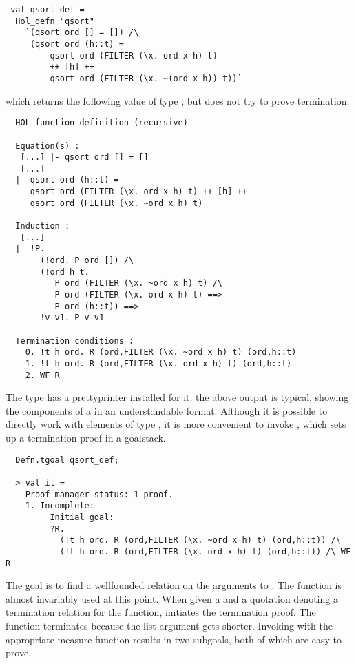 \setcounter{sessioncount}{0}
\begin{session}
\begin{hol}
\begin{verbatim}
 val qsort_def =
  Hol_defn "qsort"
    `(qsort ord [] = []) /\
     (qsort ord (h::t) =
         qsort ord (FILTER (\x. ord x h) t)
         ++ [h] ++
         qsort ord (FILTER (\x. ~(ord x h)) t))`
\end{verbatim}
\end{hol}
\end{session}
which returns the following value of type , but does not try
to prove termination.
\begin{session}
\begin{hol}
\begin{verbatim}
  HOL function definition (recursive)

  Equation(s) :
   [...] |- qsort ord [] = []
   [...]
  |- qsort ord (h::t) =
     qsort ord (FILTER (\x. ord x h) t) ++ [h] ++
     qsort ord (FILTER (\x. ~ord x h) t)

  Induction :
   [...]
  |- !P.
       (!ord. P ord []) /\
       (!ord h t.
          P ord (FILTER (\x. ~ord x h) t) /\
          P ord (FILTER (\x. ord x h) t) ==>
          P ord (h::t)) ==>
       !v v1. P v v1

  Termination conditions :
    0. !t h ord. R (ord,FILTER (\x. ~ord x h) t) (ord,h::t)
    1. !t h ord. R (ord,FILTER (\x. ord x h) t) (ord,h::t)
    2. WF R
\end{verbatim}
\end{hol}
\end{session}

The type  has a prettyprinter installed for it: the above
output is typical, showing the components of a  in an understandable
format. Although it is possible to directly work with elements of
type \ml{defn}, it is more convenient to invoke
\ml{Defn.tgoal}, which sets up a termination proof in a goalstack.
%
\begin{session}
\begin{hol}
\begin{verbatim}
  Defn.tgoal qsort_def;

  > val it =
    Proof manager status: 1 proof.
    1. Incomplete:
         Initial goal:
         ?R.
           (!t h ord. R (ord,FILTER (\x. ~ord x h) t) (ord,h::t)) /\
           (!t h ord. R (ord,FILTER (\x. ord x h) t) (ord,h::t)) /\ WF R
\end{verbatim}
\end{hol}
\end{session}
%
The goal is to find a wellfounded relation on the arguments to .
The function  is almost invariably used at this point.
When given a  and a quotation denoting a termination relation
for the function,  initiates the termination proof.
The \ml{qsort} function terminates because the list argument gets
shorter. Invoking \ml{WF\_REL\_TAC} with the appropriate measure
function results in two subgoals, both of which are easy to
prove.

